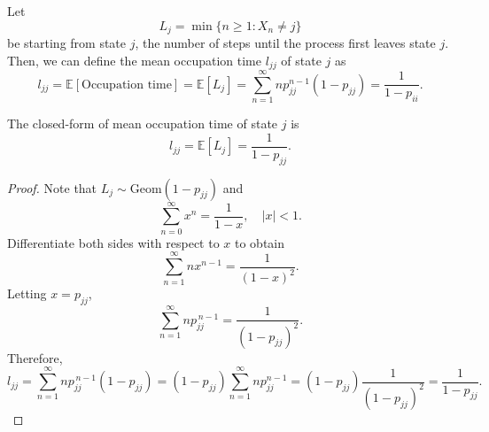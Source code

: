 \documentclass[../Note.tex]{subfiles}
\begin{document}
Let 
\[
    L_j = \min \{n \geq 1 : X_n \ne j\}
\]
be starting from state $j$, the number of steps until the process first leaves state $j$. Then, we can define the mean occupation time $l_{jj}$ of state $j$ as
\[ 
    l_{jj} = \mathbb{E}[\text{Occupation time}] = \mathbb{E}[L_j] = \sum_{n = 1}^{\infty} n p_{jj}^{n-1}(1-p_{jj}) = \frac{1}{1-p_{ii}}. 
\]

\begin{proposition}
    The closed-form of mean occupation time of state $j$ is
    \[
        l_{jj}=\mathbb{E}[L_j]=\frac{1}{1-p_{jj}}.
    \]
\end{proposition}

\begin{proof}
    Note that $L_{j} \sim \mathrm{Geom}(1 - p_{jj})$ and 
    \[
        \sum_{n=0}^{\infty}x^n = \frac{1}{1-x}, \quad |x|<1.
    \]
    Differentiate both sides with respect to $x$ to obtain
    \[
        \sum_{n=1}^{\infty} n x^{n-1}=\frac{1}{(1-x)^2}.
    \]
    Letting $x=p_{jj}$,
    \[
        \sum_{n=1}^{\infty}n p_{jj}^{\,n-1}=\frac{1}{(1-p_{jj})^2}.
    \]
    Therefore,
    \[ 
        l_{jj}=\sum_{n=1}^{\infty}n p_{jj}^{\,n-1}(1-p_{jj}) =(1-p_{jj})\sum_{n=1}^{\infty}n p_{jj}^{n-1} =(1-p_{jj})\frac{1}{(1-p_{jj})^2} =\frac{1}{1-p_{jj}}. 
    \]
\end{proof}
\end{document}
